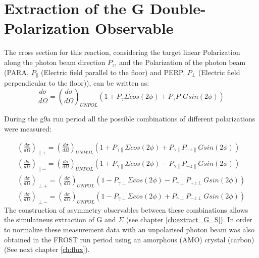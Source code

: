 \section{Extraction of the G Double-Polarization Observable}
The cross section for this reaction, considering the target linear Polarization along the photon beam direction $P_z$, and the Polarization of the photon beam (PARA, $P_{\parallel}$ (Electric field parallel to the floor) and PERP, $P_{\perp}$ (Electric field perpendicular to the floor)), can be written as:
\begin{equation}
  \frac{d\sigma}{d\Omega} = \left(\frac{d\sigma}{d\Omega}\right)_{UNPOL}  \left( 1 + P_{\gamma}\Sigma cos(2\phi) + P_{\gamma} P_z G sin(2\phi) \right)
  \label{eqn:extract_G_S}
\end{equation}

During the g9a run period all the possible combinations of different polarizations were measured:

\begin{eqnarray}
\left(\frac{d\sigma}{d\Omega}\right)_{\parallel +} = \left(\frac{d\sigma}{d\Omega}\right)_{UNPOL}  \left( 1 + P_{\gamma \parallel}\Sigma cos(2\phi) + P_{\gamma \parallel} P_{+z\parallel} G sin(2\phi) \right) \\
\left(\frac{d\sigma}{d\Omega}\right)_{\parallel -} = \left(\frac{d\sigma}{d\Omega}\right)_{UNPOL}  \left( 1 + P_{\gamma \parallel}\Sigma cos(2\phi) - P_{\gamma \parallel} P_{-z\parallel} G sin(2\phi) \right) \\
\left(\frac{d\sigma}{d\Omega}\right)_{\perp +} = \left(\frac{d\sigma}{d\Omega}\right)_{UNPOL}  \left( 1 - P_{\gamma \perp}\Sigma cos(2\phi) - P_{\gamma \perp} P_{+z\perp} G sin(2\phi) \right) \\
\left(\frac{d\sigma}{d\Omega}\right)_{\perp -} = \left(\frac{d\sigma}{d\Omega}\right)_{UNPOL}  \left( 1 - P_{\gamma \perp}\Sigma cos(2\phi) + P_{\gamma \perp} P_{-z\perp} G sin(2\phi) \right)
\end{eqnarray}
The construction of asymmetry observables between these combinations allows the simulatneus extraction of G and $\Sigma$ (see chapter \ref{ch:extract_G_S}). In order to normalize these measurement data with an unpolarised photon beam was also obtained in the FROST run period using an amorphous (AMO) crystal (carbon) (See next chapter \ref{ch:flux}). 

